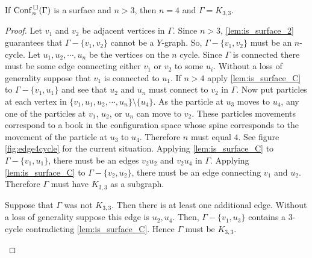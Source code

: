 \begin{thm}
    If \(\mathrm{Conf}^{\,\square}_n(\Gamma)\) is a surface and \(n > 3\), then \(n = 4\) and \(\Gamma = K_{3,3}\).
\end{thm}
\begin{proof}
    Let \(v_1\) and \(v_2\) be adjacent vertices in \(\Gamma\).
    Since \(n > 3\), \ref{lem:is_surface_2} guarantees that \(\Gamma - \{v_1, v_2\}\) cannot be a \(Y\)-graph.
    So, \(\Gamma - \{v_1, v_2\}\) must be an \(n\)-cycle.
    Let \(u_1, u_2, \cdots, u_n\) be the vertices on the \(n\) cycle.
    Since \(\Gamma\) is connected there must be some edge connecting either \(v_1\) or \(v_2\) to some \(u_i\).
    Without a loss of generality suppose that \(v_1\) is connected to \(u_1\).
    If \(n > 4\) apply \ref{lem:is_surface_C} to \(\Gamma - \{v_1, u_1\}\) and see that
    \(u_2\) and \(u_n\) must connect to \(v_2\) in \(\Gamma\).
    Now put particles at each vertex in \(\{v_1, u_1, u_2, \cdots, u_n\}\setminus\{u_4\}\).
    As the particle at \(u_3\) moves to \(u_4\), any one of the particles at \(v_1\), \(u_2\), or \(u_n\) 
    can move to \(v_2\). These particles movements correspond to a book in the configuration space
    whose spine corresponds to the movement of the particle at \(u_3\) to \(u_4\).
    Therefore \(n\) must equal \(4\).
    See figure \ref{fig:edge4cycle} for the current situation.
    Applying \ref{lem:is_surface_C} to \(\Gamma - \{v_1, u_1\}\), there must be an edges
    \(v_2 u_2\) and \(v_2 u_4\) in \(\Gamma\).
    Applying \ref{lem:is_surface_C} to \(\Gamma - \{v_2, u_2\}\), there must be an edge connecting \(v_1\)
    and \(u_2\).
    Therefore \(\Gamma\) must have \(K_{3,3}\) as a subgraph.

    Suppose that \(\Gamma\) was not \(K_{3,3}\).
    Then there is at least one additional edge.
    Without a loss of generality suppose this edge is \(u_2, u_4\).
    Then, \(\Gamma - \{v_1, u_3\}\) contains a \(3\)-cycle contradicting \ref{lem:is_surface_C}.
    Hence \(\Gamma\) must be \(K_{3,3}\).
    \begin{figure}
        \centering
\end{figure}
\end{proof}
